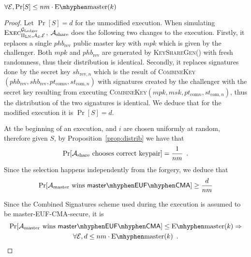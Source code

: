   \begin{proposition}
  \label{prop:forgery:master}
    $\forall \environment, \Pr[S] \leq nm \cdot \mathrm{E \mhyphen master}(k)$
  \end{proposition}

  \begin{proof}
    Let $\Pr[S] = d$ for the unmodified execution. When simulating
    $\textsc{Exec}^{\mathcal{G}_{\mathrm{Ledger}}}_{\Pi_{\mathrm{LN}}, \mathcal{A}_{\mathrm{d}},
    \mathcal{E}}$, $\mathcal{A}_{\mathrm{share}}$ does the following two changes
    to the execution. Firstly, it replaces a single $phb_{\mathrm{rev}}$ public
    master key with $mpk$ which is given by the challenger. Both $mpk$ and
    $phb_{\mathrm{rev}}$ are generated by \textsc{KeyShareGen}() with fresh
    randomness, thus their distribution is identical. Secondly, it replaces
    signatures done by the secret key $sh_{\mathrm{rev}, n}$ which is the result
    of \textsc{CombineKey}$(phb_{\mathrm{rev}}, shb_{\mathrm{rev}},
    pt_{\mathrm{com} n}, st_{\mathrm{com}, n})$ with signatures created by the
    challenger with the secret key resulting from executing
    \textsc{CombineKey}$(mpk, msk, pt_{\mathrm{com} n}, st_{\mathrm{com}, n})$,
    thus the distribution of the two signatures is identical. We deduce that for
    the modified execution it is $\Pr[S] = d$.

    At the beginning of an execution, \alice and $i$ are chosen uniformly
    at random, therefore given $S$, by Proposition~\ref{prop:distrib} we have
    that
    \begin{equation*}
      \Pr[\mathcal{A}_{\mathrm{share}} \text{ chooses correct keypair}] =
      \frac{1}{nm} \enspace.
    \end{equation*}
    Since the selection happens independently from the forgery, we deduce that
    \begin{equation*}
      \Pr[\adversary_{\mathrm{master}} \text{ wins } \mathsf{master \mhyphen EUF
      \mhyphen CMA}] \geq \frac{d}{nm}
    \end{equation*}

    Since the Combined Signatures scheme used during the execution is
    assumed to be \textsf{master-EUF-CMA}-secure, it is
    \begin{gather*}
      \Pr[\adversary_{\mathrm{master}} \text{ wins } \mathsf{master \mhyphen EUF
      \mhyphen CMA}] \leq \mathrm{E \mhyphen master}(k) \Rightarrow \\
      \forall \environment, d \leq nm \cdot \mathrm{E \mhyphen master}(k)
      \enspace.
    \end{gather*}
  \end{proof}
